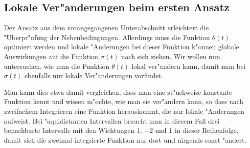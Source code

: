 \documentclass[a4paper]{scrartcl}
\begin{document}
\subsection{Lokale Ver"anderungen beim ersten Ansatz}

Der Ansatz aus dem vorangegangenen Unterabschnitt erleichtert die "Uberpr"ufung der Nebenbedingungen. 
Allerdings muss die Funktion $\theta(t)$ optimiert werden und lokale "Anderungen bei dieser Funktion k"onnen globale Auswirkungen auf die Funktion $\sigma(t)$ nach sich ziehen. 
Wir wollen nun untersuchen, wie man die Funktion $\theta(t)$ lokal ver"andern kann, damit man bei $\sigma(t)$ ebenfalls nur lokale Ver"anderungen vorfindet. 

Man kann dies etwa damit vergleichen, dass man eine st"uckweise konstante Funktion kennt und wissen m"ochte, wie man sie ver"andern kann, so dass nach zweifachem Integrieren eine Funktion herauskommt, die nur lokale "Anderungen aufweist. 
Bei "aquidistanten Intervallen braucht man in diesem Fall drei benachbarte Intervalle mit den Wichtungen $1$, $-2$ und $1$ in dieser Reihenfolge, damit sich die zweimal integrierte Funktion nur dort und nirgends sonst "andert. 
\end{document}
